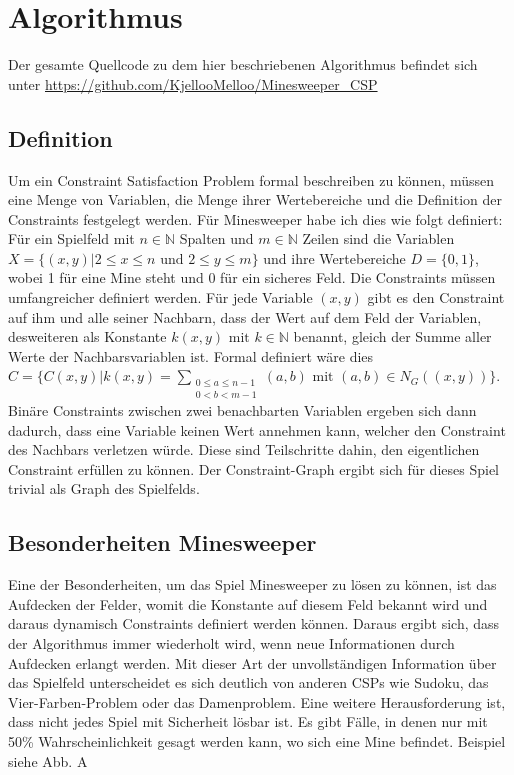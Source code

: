 %
\graphicspath{{chapters/images/}}
\section{Algorithmus}

Der gesamte Quellcode zu dem hier beschriebenen Algorithmus befindet sich unter \url{https://github.com/KjellooMelloo/Minesweeper_CSP}

\subsection{Definition}
Um ein Constraint Satisfaction Problem formal beschreiben zu können, müssen eine Menge von Variablen, die Menge 
ihrer Wertebereiche und die Definition der Constraints festgelegt werden. Für Minesweeper habe ich dies wie folgt definiert:
Für ein Spielfeld mit $n\in \mathbb{N}$ Spalten und $m\in\mathbb{N}$ Zeilen sind
die Variablen $X=\{(x, y) | 2\le x\le n  \text{ und }  2\le y\le m\}$ und ihre Wertebereiche $D=\{0, 1\}$, wobei 1
für eine Mine steht und 0 für ein sicheres Feld.
Die Constraints müssen umfangreicher definiert werden. Für jede Variable $(x, y)$ gibt es den Constraint auf ihm und alle seiner 
Nachbarn, dass der Wert auf dem Feld der Variablen, desweiteren als Konstante $k(x, y) \text{ mit } k\in\mathbb{N}$ 
benannt, gleich der Summe aller Werte der Nachbarsvariablen ist. Formal definiert wäre dies
$C=\{C(x, y) | k(x, y) = \sum_{\substack{0\le a\le n-1\\0<b<m-1}}{(a, b)} \text{ mit } (a, b)\in N_G((x, y))\}$.
Binäre Constraints zwischen zwei benachbarten Variablen ergeben sich dann dadurch, dass eine Variable keinen Wert annehmen kann, 
welcher den Constraint des Nachbars verletzen würde. Diese sind Teilschritte dahin, den eigentlichen Constraint erfüllen zu können.
Der Constraint-Graph ergibt sich für dieses Spiel trivial als Graph des Spielfelds.

\subsection{Besonderheiten Minesweeper}
Eine der Besonderheiten, um das Spiel Minesweeper zu lösen zu können, ist das Aufdecken der Felder, womit die Konstante auf diesem Feld
bekannt wird und daraus dynamisch Constraints definiert werden können. Daraus ergibt sich, dass der Algorithmus immer wiederholt wird,
wenn neue Informationen durch Aufdecken erlangt werden. Mit dieser Art der unvollständigen Information über das Spielfeld unterscheidet es
sich deutlich von anderen CSPs wie Sudoku, das Vier-Farben-Problem oder das Damenproblem.
Eine weitere Herausforderung ist, dass nicht jedes Spiel mit Sicherheit lösbar ist. Es gibt Fälle, in denen nur mit 50\% Wahrscheinlichkeit
gesagt werden kann, wo sich eine Mine befindet. Beispiel siehe Abb. A

